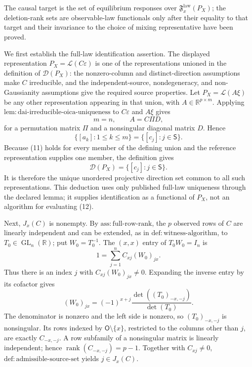 The causal target is the set of equilibrium responses over \(\mathfrak F_x^{\mathrm{law}}(P_X)\); the deletion-rank sets are observable-law functionals only after their equality to that target and their invariance to the choice of mixing representative have been proved.

We first establish the full-law identification assertion. The displayed representation \(P_X=\mathcal L(C\varepsilon)\) is one of the representations unioned in the definition of \(\mathcal D(P_X)\): the nonzero-column and distinct-direction assumptions make \(C\) irreducible, and the independent-source, nondegeneracy, and non-Gaussianity assumptions give the required source properties. Let \(P_X=\mathcal L(A\xi)\) be any other representation appearing in that union, with \(A\in\mathbb R^{p\times m}\). Applying \(\mathrm{lem:dai\text{-}irreducible\text{-}oica\text{-}uniqueness}\) to \(C\varepsilon\) and \(A\xi\) gives
\[
 m=n,\qquad A=C\Pi D, \tag{10}
\]
for a permutation matrix \(\Pi\) and a nonsingular diagonal matrix \(D\). Hence
\[
 \{[a_k]:1\le k\le m\}=\{[c_j]:j\in\mathsf S\}. \tag{11}
\]
Because (11) holds for every member of the defining union and the reference representation supplies one member, the definition gives
\[
 \mathcal D(P_X)=\{[c_j]:j\in\mathsf S\}. \tag{12}
\]
It is therefore the unique unordered projective direction set common to all such representations. This deduction uses only published full-law uniqueness through the declared lemma; it supplies identification as a functional of \(P_X\), not an algorithm for evaluating (12).

Next, \(J_x(C)\) is nonempty. By \(\mathrm{ass:full\text{-}row\text{-}rank}\), the \(p\) observed rows of \(C\) are linearly independent and can be extended, as in \(\mathrm{def:witness\text{-}algorithm}\), to \(T_0\in\operatorname{GL}_n(\mathbb R)\); put \(W_0=T_0^{-1}\). The \((x,x)\) entry of \(T_0W_0=I_n\) is
\[
 1=\sum_{j=1}^n C_{xj}(W_0)_{jx}. \tag{13}
\]
Thus there is an index \(j\) with \(C_{xj}(W_0)_{jx}\ne0\). Expanding the inverse entry by its cofactor gives
\[
 (W_0)_{jx}=(-1)^{x+j}\frac{\det((T_0)_{-x,-j})}{\det(T_0)}. \tag{14}
\]
The denominator is nonzero and the left side is nonzero, so \((T_0)_{-x,-j}\) is nonsingular. Its rows indexed by \(\mathsf O\setminus\{x\}\), restricted to the columns other than \(j\), are exactly \(C_{-x,-j}\). A row subfamily of a nonsingular matrix is linearly independent; hence \(\operatorname{rank}(C_{-x,-j})=p-1\). Together with \(C_{xj}\ne0\), \(\mathrm{def:admissible\text{-}source\text{-}set}\) yields \(j\in J_x(C)\).

